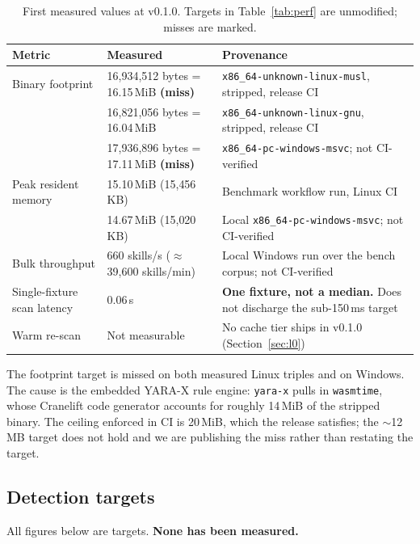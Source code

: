 \documentclass[11pt]{article}
\begin{document}
\begin{table}[htbp]
\centering
\caption{First measured values at v0.1.0. Targets in Table~\ref{tab:perf} are unmodified; misses are marked.}
\label{tab:measured}
\small
\begin{tabularx}{\textwidth}{p{}p{}X}
\toprule
Metric & Measured & Provenance \\
\midrule
Binary footprint & 16{,}934{,}512 bytes = 16.15\,MiB \textbf{(miss)} & \texttt{x86\_64-unknown-linux-musl}, stripped, release CI \\
 & 16{,}821{,}056 bytes = 16.04\,MiB & \texttt{x86\_64-unknown-linux-gnu}, stripped, release CI \\
 & 17{,}936{,}896 bytes = 17.11\,MiB \textbf{(miss)} & \texttt{x86\_64-pc-windows-msvc}; not CI-verified \\
Peak resident memory & 15.10\,MiB (15{,}456\,KB) & Benchmark workflow run, Linux CI \\
 & 14.67\,MiB (15{,}020\,KB) & Local \texttt{x86\_64-pc-windows-msvc}; not CI-verified \\
Bulk throughput & 660 skills/s ($\approx$39{,}600 skills/min) & Local Windows run over the bench corpus; not CI-verified \\
Single-fixture scan latency & 0.06\,s & \textbf{One fixture, not a median.} Does not discharge the sub-150\,ms target \\
Warm re-scan & Not measurable & No cache tier ships in v0.1.0 (Section~\ref{sec:l0}) \\
\bottomrule
\end{tabularx}
\end{table}

The footprint target is missed on both measured Linux triples and on Windows. The cause is the embedded YARA-X rule engine: \texttt{yara-x} pulls in \texttt{wasmtime}, whose Cranelift code generator accounts for roughly 14\,MiB of the stripped binary. The ceiling enforced in CI is 20\,MiB, which the release satisfies; the $\sim$12\,MB target does not hold and we are publishing the miss rather than restating the target.

\subsection{Detection targets}
\label{sec:detection}

All figures below are targets. \textbf{None has been measured.}
\end{document}
